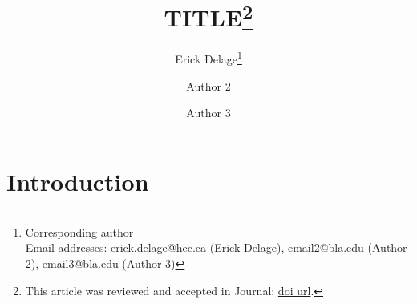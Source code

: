 \documentclass[11pt]{article}
\begin{document}


\title{TITLE\footnote{This article was reviewed and accepted in Journal: \href{doi url}{doi url}.}}%

\author{Erick Delage\footnote{Corresponding author\\Email addresses: erick.delage@hec.ca (Erick Delage), email2@bla.edu (Author 2), email3@bla.edu (Author 3)}}
\author{Author 2}
\author{Author 3}
\date{}


\maketitle


\section{Introduction}









\end{document}
